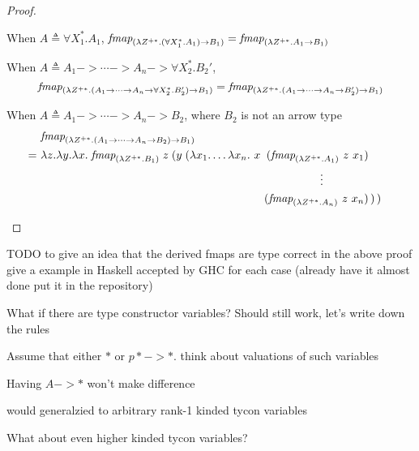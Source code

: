 \begin{proof}
\begin{itemize}
	When $A \triangleq \forall X_1^{*}.A_1$,
	$\textit{fmap}_{(\lambda Z^{+*}.(\forall X_1^{*}.A_1) -> B_1)}
	= \textit{fmap}_{(\lambda Z^{+*}.A_1 -> B_1)}$

	\begin{singlespace}
	When $A \triangleq A_1 -> \cdots -> A_n -> \forall X_2^{*}.B_2'$,
	\vspace{-1.5ex}
	\[\textit{fmap}_{(\lambda Z^{+*}.(A_1 -> \cdots -> A_n -> \forall X_2^{*}.B_2') -> B_1)}
	= \textit{fmap}_{(\lambda Z^{+*}.(A_1 -> \cdots -> A_n -> B_2') -> B_1)} \]

	When $A \triangleq A_1 -> \cdots -> A_n -> B_2$,
	where $B_2$ is not an arrow type
	\vspace{-1.5ex}
	\begin{align*}
	  & \textit{fmap}_{(\l Z^{+*}.(A_1 -> \cdots -> A_n -> B_2) -> B_1)} \\
	=~& \l z.\l y. \l x.\;
	\textit{fmap}_{(\l Z^{+*}.B_1)} \; z \;
		(y \; (\l x_1.\ldots\l x_n. ~
		   x  &\!\!\!\!(\textit{fmap}_{(\l Z^{+*}.A_1)} ~ z ~ x_1)& \\
		     &&\!\!\!\!\vdots \qquad\qquad& \\
		     &&\!\!\!\!(\textit{fmap}_{(\l Z^{+*}.A_n)} ~ z ~ x_n)&
		\,) \,)
	\end{align*}
	\end{singlespace}

\end{itemize}
\end{proof}

TODO to give an idea that the derived fmaps are type correct in the above
proof give a example in Haskell accepted by GHC for each case
(already have it almost done put it in the repository)

What if there are type constructor variables?
Should still work, let's write down the rules


Assume that either $*$ or $p* -> *$.
think about valuations of such variables

Having $A -> *$ won't make difference

would generalzied to arbitrary rank-1 kinded tycon variables


What about even higher kinded tycon variables?


